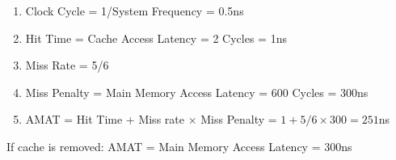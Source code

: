 \begin{questions}
{
    \begin{solution}
        \begin{enumerate}[$\bullet$]
            \item Clock Cycle = 1/System Frequency = 0.5ns
            \item Hit Time = Cache Access Latency = 2 Cycles = 1ns
            \item Miss Rate = 5/6
            \item Miss Penalty = Main Memory Access Latency = 600 Cycles = 300ns
            \item AMAT = Hit Time + Miss rate $\times$ Miss Penalty = $1+5/6\times 300=251$ns
        \end{enumerate}
        If cache is removed:
        AMAT = Main Memory Access Latency = 300ns
    \end{solution}
}

\end{questions}